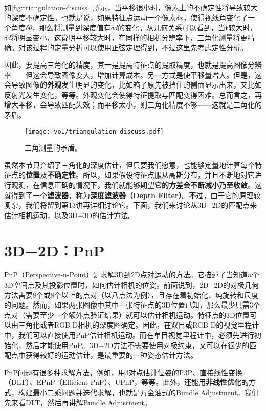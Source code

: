 如\autoref{fig:triangulation-discuss}~所示，当平移很小时，像素上的不确定性将导致较大的深度不确定性。也就是说，如果特征点运动一个像素$\delta x$，使得视线角变化了一个角度$\delta \theta$，那么将测量到深度值有$\delta d$的变化。从几何关系可以看到，当$\bm{t}$较大时，$\delta d$将明显变小，这说明平移较大时，在同样的相机分辨率下，三角化测量将更精确。对该过程的定量分析可以使用正弦定理得到，不过这里先考虑定性分析。

因此，要提高三角化的精度，其一是提高特征点的提取精度，也就是提高图像分辨率——但这会导致图像变大，增加计算成本。另一方式是使平移量增大。但是，这会导致图像的\textbf{外观}发生明显的变化，比如箱子原先被挡住的侧面显示出来，又比如反射光发生变化，等等。外观变化会使得特征提取与匹配变得困难。总而言之，再增大平移，会导致匹配失效；而平移太小，则三角化精度不够——这就是三角化的矛盾。

\begin{figure}[!ht]
	\centering
	\texttt{[image: vo1/triangulation-discuss.pdf]}
	\caption{三角测量的矛盾。}
	\label{fig:triangulation-discuss}
\end{figure}

虽然本节只介绍了三角化的深度估计，但只要我们愿意，也能够定量地计算每个特征点的\textbf{位置}及\textbf{不确定性}。所以，如果假设特征点服从高斯分布，并且不断地对它进行观测，在信息正确的情况下，我们就能够期望\textbf{它的方差会不断减小乃至收敛}。这就得到了一个\textbf{滤波器}，称为\textbf{深度滤波器（Depth Filter）}。不过，由于它的原理较复杂，我们将留到第13讲再详细讨论它。下面，我们来讨论从3D−2D的匹配点来估计相机运动，以及3D−3D的估计方法。

\section{3D−2D：PnP}
PnP（Perspective-n-Point）是求解3D到2D点对运动的方法。它描述了当知道$n$个3D空间点及其投影位置时，如何估计相机的位姿。前面说到，2D−2D的对极几何方法需要8个或8个以上的点对（以八点法为例），且存在着初始化、纯旋转和尺度的问题。然而，如果两张图像中其中一张特征点的3D位置已知，那么最少只需3个点对（需要至少一个额外点验证结果）就可以估计相机运动。特征点的3D位置可以由三角化或者RGB-D相机的深度图确定。因此，在双目或RGB-D的视觉里程计中，我们可以直接使用PnP估计相机运动。而在单目视觉里程计中，必须先进行初始化，然后才能使用PnP。3D−2D方法不需要使用对极约束，又可以在很少的匹配点中获得较好的运动估计，是最重要的一种姿态估计方法。

\clearpage
PnP问题有很多种求解方法，例如，用3对点估计位姿的P3P\textsuperscript{\cite{GaoHouTangEtAl2003}}、直接线性变换（DLT）、EPnP（Efficient PnP）\textsuperscript{\cite{LepetitMoreno-NoguerFua2008}}、UPnP\textsuperscript{\cite{Penate-SanchezAndrade-CettoMoreno-Noguer2013}}，等等。此外，还能用\textbf{非线性优化}的方式，构建最小二乘问题并迭代求解，也就是万金油式的Bundle Adjustment。我们先来看DLT，然后再讲解Bundle Adjustment。


